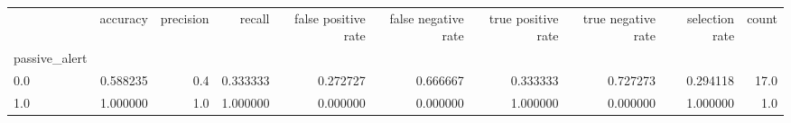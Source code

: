 \begin{tabular}{lrrrrrrrrr}
\toprule
{} &  accuracy &  precision &    recall &  false positive rate &  false negative rate &  true positive rate &  true negative rate &  selection rate &  count \\
passive\_alert &           &            &           &                      &                      &                     &                     &                 &        \\
\midrule
0.0           &  0.588235 &        0.4 &  0.333333 &             0.272727 &             0.666667 &            0.333333 &            0.727273 &        0.294118 &   17.0 \\
1.0           &  1.000000 &        1.0 &  1.000000 &             0.000000 &             0.000000 &            1.000000 &            0.000000 &        1.000000 &    1.0 \\
\bottomrule
\end{tabular}
